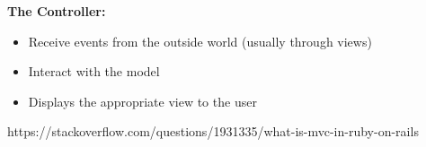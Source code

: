 \textbf{The Controller:}
\vspace{-5mm}
\begin{itemize}
 \setlength{\itemsep}{-5pt}
\item Receive events from the outside world (usually through views)
\item Interact with the model
\item Displays the appropriate view to the user
\end{itemize}

https://stackoverflow.com/questions/1931335/what-is-mvc-in-ruby-on-rails




